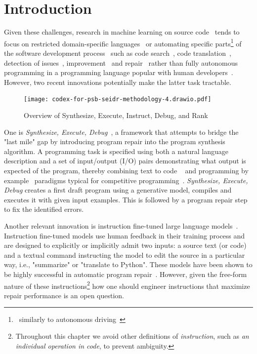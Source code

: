 \newcommand{\smalltt}[1]{\texttt{\small#1}}

\section{Introduction}
\label{sec:seidr-intro}



Given these challenges, research in machine learning on source code~\cite{allamanis2018:survey} tends to focus on restricted domain-specific languages~\cite{chen2021:latent,flashmeta,liventsev2021:bf} or automating specific parts\footnote{~similarly to autonomous driving~\cite{grigorescu2020:survey,marcano2020:review}} of the software development process~\cite{lu2021:codexglue,niu2023:crosscodebench} such as code search~\cite{husain2020:codesearchnet}, code translation~\cite{roziere2020:unsupervised}, detection of issues~\cite{fernandes2016:reviewbased,chakraborty2021:deep}, improvement~\cite{petke2018:genetic} and repair~\cite{gouesAutomatedProgramRepair2019} rather than fully autonomous programming in a programming language popular with human developers~\cite{:tiobe}.
However, two recent innovations potentially make the latter task tractable.

\begin{figure}
    \centering
    \texttt{[image: codex-for-psb-seidr-methodology-4.drawio.pdf]}
    \caption{Overview of Synthesize, Execute, Instruct, Debug, and Rank}
    \label{fig:method}
\end{figure}

One is \emph{Synthesize, Execute, Debug}~\cite{guptaSynthesizeExecuteDebug2020}, a framework that attempts to bridge the "last mile" gap by introducing program repair into the program synthesis algorithm. 
A programming task is specified using both a natural language description and a set of input/output (I/O) pairs demonstrating what output is expected of the program, thereby combining text to code ~\cite{iyer2018:mapping} and programming by example~\cite{halbertProgrammingExample1984,gulwani2016:programming} paradigms typical for competitive programming~\cite{zavershynskyi2018:naps}.
\emph{Synthesize, Execute, Debug} creates a first draft program using a generative model, compiles and executes it with given input examples.
This is followed by a program repair step to fix the identified errors.

Another relevant innovation is instruction fine-tuned large language models~\cite{ouyang2022:training}. Instruction fine-tuned models use human feedback in their training process and are designed to explicitly or implicitly admit two inputs: a source text (or code) and a textual command instructing the model to edit the source in a particular way, i.e., "summarize" or "translate to Python".
These models have been shown to be highly successful in automatic program repair~\cite{fanAutomatedRepairPrograms2023}. 
However, given the free-form nature of these instructions\footnote{Throughout this chapter we avoid other definitions of \emph{instruction}, such as \emph{an individual operation in code}, to prevent ambiguity.} how one should engineer instructions that maximize repair performance is an open question. 

